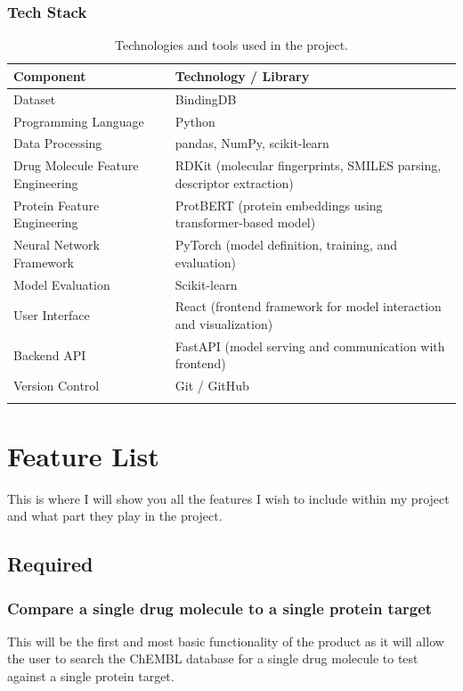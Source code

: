 \subsubsection{Tech Stack}
\begin{table}[H]
    \centering
    \begin{tabular}{@{}lp{10cm}@{}}
    \toprule
    \textbf{Component} & \textbf{Technology / Library} \\
    \midrule
    Dataset & BindingDB  \\
    \addlinespace
    \midrule
    Programming Language & Python \\
    \addlinespace
    \midrule
    Data Processing & pandas, NumPy, scikit-learn \\
    \addlinespace
    \midrule
    Drug Molecule Feature Engineering & RDKit (molecular fingerprints, SMILES parsing, descriptor extraction) \\
    \addlinespace
    \midrule
    Protein Feature Engineering & ProtBERT (protein embeddings using transformer-based model) \\
    \addlinespace
    \midrule
    Neural Network Framework & PyTorch (model definition, training, and evaluation) \\
    \addlinespace
    \midrule
    Model Evaluation & Scikit-learn \\
    \addlinespace
    \midrule
    User Interface & React (frontend framework for model interaction and visualization) \\
    \addlinespace
    \midrule
    Backend API & FastAPI (model serving and communication with frontend) \\
    \addlinespace
    \midrule
    Version Control & Git / GitHub \\
    \addlinespace
    \bottomrule
    \end{tabular}
    \caption{Technologies and tools used in the project.}
    \label{tab:tech_stack}
\end{table}

\section{Feature List}
This is where I will show you all the features I wish to include within my project and what part they play in the project.

\subsection{Required}
\subsubsection{Compare a single drug molecule to a single protein target}
This will be the first and most basic functionality of the product as it will allow the user to search the ChEMBL database for a single drug molecule to test against a single protein target. 
